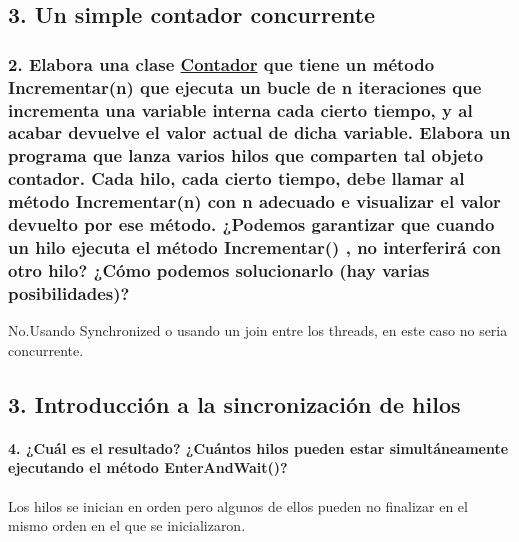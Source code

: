 \subsection*{3. Un simple contador concurrente}

\subsubsection*{2. Elabora una clase \hyperlink{classContador}{Contador} que tiene un método Incrementar(n) que ejecuta un bucle de n iteraciones que incrementa una variable interna cada cierto tiempo, y al acabar devuelve el valor actual de dicha variable. Elabora un programa que lanza varios hilos que comparten tal objeto contador. Cada hilo, cada cierto tiempo, debe llamar al método Incrementar(n) con n adecuado e visualizar el valor devuelto por ese método. ¿\-Podemos garantizar que cuando un hilo ejecuta el método Incrementar() , no interferirá con otro hilo? ¿\-Cómo podemos solucionarlo (hay varias posibilidades)?}

No.\-Usando Synchronized o usando un join entre los threads, en este caso no seria concurrente.

\subsection*{3. Introducción a la sincronización de hilos}

\paragraph*{4. ¿\-Cuál es el resultado? ¿\-Cuántos hilos pueden estar simultáneamente ejecutando el método Enter\-And\-Wait()?}

Los hilos se inician en orden pero algunos de ellos pueden no finalizar en el mismo orden en el que se inicializaron. 